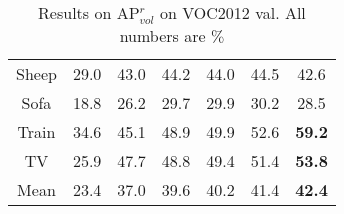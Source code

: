 \documentclass[10pt,twocolumn,letterpaper]{article}
\begin{document}
\begin{table*}[!htb]
\begin{center}
\begin{tabular}{|c|c|c|c|c|c|c|}
Sheep & 29.0 & 43.0 & 44.2 & 44.0 & 44.5 & 42.6 \\                                                  
Sofa & 18.8 & 26.2 & 29.7 & 29.9 & 30.2 & 28.5 \\                                                   
Train & 34.6 & 45.1 & 48.9 & 49.9 & 52.6 & \textbf{59.2} \\                                                  
TV & 25.9 & 47.7 & 48.8 & 49.4 & 51.4 & \textbf{53.8} \\      
\hline                                               
Mean & 23.4 & 37.0 & 39.6 & 40.2 & 41.4 & \textbf{42.4} \\     
\hline                               
\end{tabular}  
\end{center}                      
\caption{Results on AP$^r_{vol}$ on VOC2012 val. All numbers are $\%$}          
\label{tab:sdsaprvol}
\end{table*} 

\end{document}

